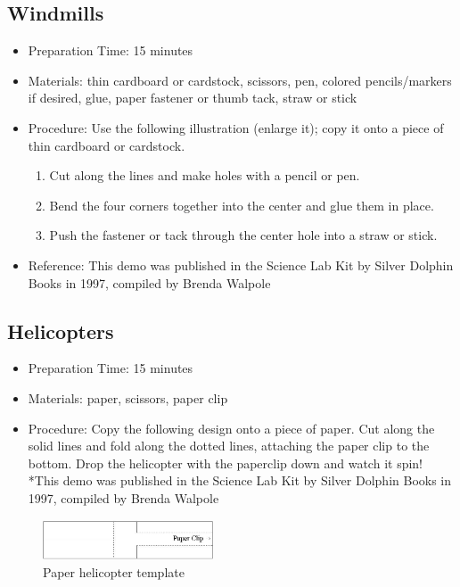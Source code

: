 


\subsection{Windmills}
\begin{itemize}
\item{Preparation Time: 15 minutes}
\item{Materials: thin cardboard or cardstock, scissors, pen, colored pencils/markers if desired, glue, paper fastener or thumb tack, straw or stick}
\item{Procedure: Use the following illustration (enlarge it); copy it onto a piece of thin cardboard or cardstock.}
\begin{enumerate}
\item{Cut along the lines and make holes with a pencil or pen.}
\item{Bend the four corners together into the center and glue them in place.}
\item{Push the fastener or tack through the center hole into a straw or stick.}
\end{enumerate}
\item{Reference: This demo was published in the Science Lab Kit by Silver Dolphin Books in 1997, compiled by Brenda Walpole}
\end{itemize}

\subsection{Helicopters}
\begin{itemize}
\item{Preparation Time: 15 minutes}
\item{Materials: paper, scissors, paper clip}
\item{Procedure: Copy the following design onto a piece of paper. Cut along the solid lines and fold along the dotted lines, attaching the paper clip to the bottom. Drop the helicopter with the paperclip down and watch it spin!
*This demo was published in the Science Lab Kit by Silver Dolphin Books in 1997, compiled by Brenda Walpole}
\end{itemize}

\begin{figure}[h!]
\begin{center}
\includegraphics[width=0.45\textwidth]{./img/helicopter-1.png}
\caption{Paper helicopter template}
\label{fig:helicopter-1}
\end{center}
\end{figure}

